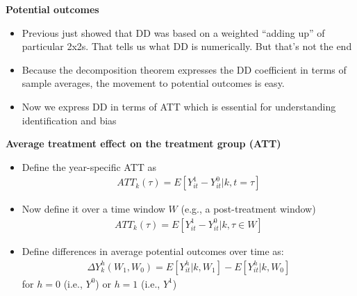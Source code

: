 \documentclass[notes=show]{beamer}
\begin{document}

\begin{frame}[plain]
\begin{center}
\textbf{Potential outcomes}
\end{center}

\begin{itemize}
\item Previous just showed that DD was based on a weighted ``adding up'' of particular 2x2s. That tells us what DD is numerically.  But that's not the end
\item Because the decomposition theorem expresses the DD coefficient in terms of sample averages, the movement to potential outcomes is easy.  
\item Now we express DD in terms of ATT which is essential for understanding identification and bias
\end{itemize}

\end{frame}

\begin{frame}[plain]
\begin{center}
\textbf{Average treatment effect on the treatment group (ATT)}
\end{center}

\begin{itemize}
\item Define the year-specific ATT as
\begin{eqnarray*}
ATT_k(\tau) = E[Y^1_{it}-Y^0_{it} | k, t=\tau]
\end{eqnarray*}
\item Now define it over a time window $W$ (e.g., a post-treatment window)
\begin{eqnarray*}
ATT_k(\tau) = E[Y^1_{it}-Y^0_{it} | k, \tau \in W]
\end{eqnarray*}
\item Define differences in average potential outcomes over time as:
\begin{eqnarray*}
\Delta Y^h_k(W_1,W_0) = E[Y^h_{it} |k, W_1] - E[Y^h_{it} |k, W_0] 
\end{eqnarray*}for $h=0$ (i.e., $Y^0$) or $h=1$ (i.e., $Y^1$)
\end{itemize}

\end{frame}
\end{document}

